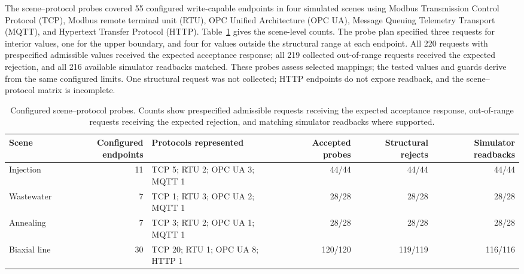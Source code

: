 \documentclass[journal]{IEEEtran}
\begin{document}
The scene--protocol probes covered 55 configured write-capable endpoints in four simulated scenes using Modbus Transmission Control Protocol (TCP), Modbus remote terminal unit (RTU), OPC Unified Architecture (OPC UA), Message Queuing Telemetry Transport (MQTT), and Hypertext Transfer Protocol (HTTP). Table~\ref{tab:scene-probe-results} gives the scene-level counts. The probe plan specified three requests for interior values, one for the upper boundary, and four for values outside the structural range at each endpoint. All 220 requests with prespecified admissible values received the expected acceptance response; all 219 collected out-of-range requests received the expected rejection, and all 216 available simulator readbacks matched. These probes assess selected mappings; the tested values and guards derive from the same configured limits. One structural request was not collected; HTTP endpoints do not expose readback, and the scene--protocol matrix is incomplete.

\begin{table}[!t]
\centering
\caption{Configured scene--protocol probes. Counts show prespecified admissible requests receiving the expected acceptance response, out-of-range requests receiving the expected rejection, and matching simulator readbacks where supported.}
\label{tab:scene-probe-results}
\footnotesize
\setlength{\tabcolsep}{3pt}
\begin{tabularx}{\textwidth}{@{}>{\raggedright\arraybackslash}p{1.55cm}r X r r r@{}}
\toprule
Scene & Configured endpoints & Protocols represented & Accepted probes & Structural rejects & Simulator readbacks \\
\midrule
Injection & 11 & TCP 5; RTU 2; OPC UA 3; MQTT 1 & 44/44 & 44/44 & 44/44 \\
Wastewater & 7 & TCP 1; RTU 3; OPC UA 2; MQTT 1 & 28/28 & 28/28 & 28/28 \\
Annealing & 7 & TCP 3; RTU 2; OPC UA 1; MQTT 1 & 28/28 & 28/28 & 28/28 \\
Biaxial line & 30 & TCP 20; RTU 1; OPC UA 8; HTTP 1 & 120/120 & 119/119 & 116/116 \\
\bottomrule
\end{tabularx}
\end{table}
\end{document}
